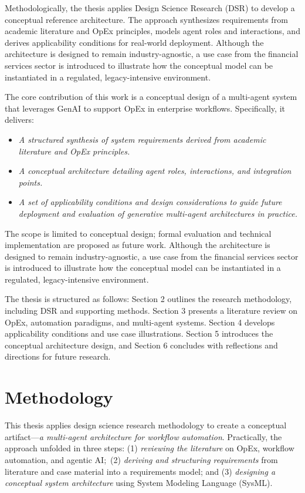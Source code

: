 Methodologically, the thesis applies Design Science Research (DSR) to develop a conceptual reference architecture. The approach synthesizes requirements from academic literature and OpEx principles, models agent roles and interactions, and derives applicability conditions for real-world deployment.
Although the architecture is designed to remain industry-agnostic, a use case from the financial services sector is introduced to illustrate how the conceptual model can be instantiated in a regulated, legacy-intensive environment.

The core contribution of this work is a conceptual design of a multi-agent system that leverages GenAI to support OpEx in enterprise workflows. Specifically, it delivers:
\begin{itemize}
    \item \emph{A structured synthesis of system requirements derived from academic literature and OpEx principles.}
    \item \emph{A conceptual architecture detailing agent roles, interactions, and integration points.}
    \item \emph{A set of applicability conditions and design considerations to guide future deployment and evaluation of generative multi-agent architectures in practice.}
\end{itemize}

The scope is limited to conceptual design; formal evaluation and technical implementation are proposed as future work. Although the architecture is designed to remain industry-agnostic, a use case from the financial services sector is introduced to illustrate how the conceptual model can be instantiated in a regulated, legacy-intensive environment.

The thesis is structured as follows: Section 2 outlines the research methodology, including DSR and supporting methods. Section 3 presents a literature review on OpEx, automation paradigms, and multi-agent systems. Section 4 develops applicability conditions and use case illustrations. Section 5 introduces the conceptual architecture design, and Section 6 concludes with reflections and directions for future research.

\section{Methodology}\label{sec:method}
This thesis applies design science research methodology to create a conceptual artifact---\emph{a multi-agent architecture for workflow automation}. Practically, the approach unfolded in three steps: (1) \emph{reviewing the literature} on OpEx, workflow automation, and agentic AI;~(2) \emph{deriving and structuring requirements} from literature and case material into a requirements model; and (3) \emph{designing a conceptual system architecture} using System Modeling Language (SysML).

